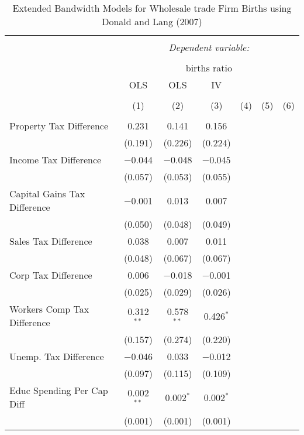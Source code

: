 
\begin{table}[!htbp] \centering 
  \caption{Extended Bandwidth Models for  Wholesale trade Firm Births using Donald and Lang (2007)} 
  \label{} 
\begin{tabular}{@{\extracolsep{5pt}}lcccccc} 
\\[-1.8ex]\hline 
\hline \\[-1.8ex] 
 & \multicolumn{6}{c}{\textit{Dependent variable:}} \\ 
\cline{2-7} 
\\[-1.8ex] & \multicolumn{6}{c}{births ratio} \\ 
 & OLS & OLS & IV &  &  &  \\ 
\\[-1.8ex] & (1) & (2) & (3) & (4) & (5) & (6)\\ 
\hline \\[-1.8ex] 
 Property Tax Difference & 0.231 & 0.141 & 0.156 &  &  &  \\ 
  & (0.191) & (0.226) & (0.224) &  &  &  \\ 
  Income Tax Difference & $-$0.044 & $-$0.048 & $-$0.045 &  &  &  \\ 
  & (0.057) & (0.053) & (0.055) &  &  &  \\ 
  Capital Gains Tax Difference & $-$0.001 & 0.013 & 0.007 &  &  &  \\ 
  & (0.050) & (0.048) & (0.049) &  &  &  \\ 
  Sales Tax Difference & 0.038 & 0.007 & 0.011 &  &  &  \\ 
  & (0.048) & (0.067) & (0.067) &  &  &  \\ 
  Corp Tax Difference & 0.006 & $-$0.018 & $-$0.001 &  &  &  \\ 
  & (0.025) & (0.029) & (0.026) &  &  &  \\ 
  Workers Comp Tax Difference & 0.312$^{**}$ & 0.578$^{**}$ & 0.426$^{*}$ &  &  &  \\ 
  & (0.157) & (0.274) & (0.220) &  &  &  \\ 
  Unemp. Tax Difference & $-$0.046 & 0.033 & $-$0.012 &  &  &  \\ 
  & (0.097) & (0.115) & (0.109) &  &  &  \\ 
  Educ Spending Per Cap Diff & 0.002$^{**}$ & 0.002$^{*}$ & 0.002$^{*}$ &  &  &  \\ 
  & (0.001) & (0.001) & (0.001) &  &  &  \\ 

\end{tabular}
\end{table}
